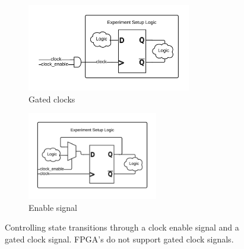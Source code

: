 \documentclass[openright]{template/uva-bachelor-thesis}
\begin{document}


\begin{figure}[h]
    \centering
    \begin{subfigure}[t]{0.5\textwidth}
        \centering
        \includegraphics[height=1.5in]{img/clock-manipulation-gated}
        \caption{Gated clocks}
        \label{fig:clock-manipulation-gated}
    \end{subfigure}%
    \begin{subfigure}[t]{0.5\textwidth}
        \centering
        \includegraphics[height=1.5in]{img/clock-manipulation-enable}
        \caption{Enable signal}
        \label{fig:clock-manipulation-enable}
    \end{subfigure}%
    \caption{Controlling state transitions through a clock enable signal and a gated clock signal. FPGA's do not support gated clock signals.}
    \label{fig:clock-manipulation}
\end{figure}
\end{document}
